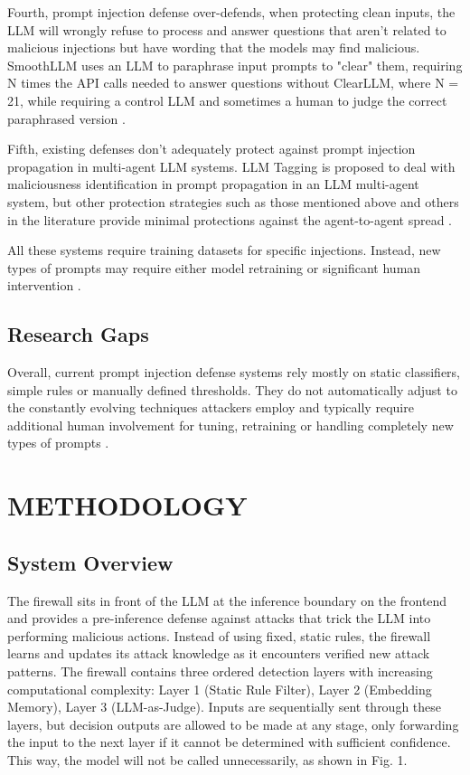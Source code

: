 \documentclass[10pt, conference, compsoc]{IEEEtran}
\begin{document}
Fourth, prompt injection defense over-defends, when protecting clean inputs, the LLM will wrongly refuse to process and answer questions that aren't related to malicious injections but have wording that the models may find malicious. SmoothLLM uses an LLM to paraphrase input prompts to "clear" them, requiring N times the API calls needed to answer questions without ClearLLM, where N = 21, while requiring a control LLM and sometimes a human to judge the correct paraphrased version \cite{robey2023smoothllm}.

Fifth, existing defenses don't adequately protect against prompt injection propagation in multi-agent LLM systems. LLM Tagging is proposed to deal with maliciousness identification in prompt propagation in an LLM multi-agent system, but other protection strategies such as those mentioned above and others in the literature provide minimal protections against the agent-to-agent spread \cite{lee2024promptinfection}.

All these systems require training datasets for specific injections. Instead, new types of prompts may require either model retraining or significant human intervention \cite{jacob2024promptshield, yao2025controlnet, chen2025detect_indirect}.

\subsection{Research Gaps}

Overall, current prompt injection defense systems rely mostly on static classifiers, simple rules or manually defined thresholds. They do not automatically adjust to the constantly evolving techniques attackers employ and typically require additional human involvement for tuning, retraining or handling completely new types of prompts \cite{jacob2024promptshield, yao2025controlnet, chen2025detect_indirect}.

\section{METHODOLOGY}

\subsection{System Overview}

The firewall sits in front of the LLM at the inference boundary on the frontend and provides a pre-inference defense against attacks that trick the LLM into performing malicious actions. Instead of using fixed, static rules, the firewall learns and updates its attack knowledge as it encounters verified new attack patterns. The firewall contains three ordered detection layers with increasing computational complexity: Layer 1 (Static Rule Filter), Layer 2 (Embedding Memory), Layer 3 (LLM-as-Judge). Inputs are sequentially sent through these layers, but decision outputs are allowed to be made at any stage, only forwarding the input to the next layer if it cannot be determined with sufficient confidence. This way, the model will not be called unnecessarily, as shown in Fig. 1.
\end{document}

